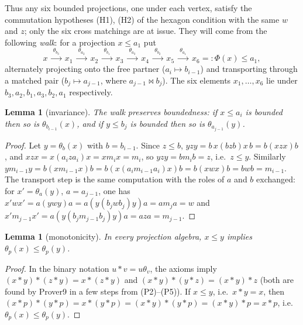 \documentclass[11pt]{amsart}
\newtheorem{lemma}[theorem]{Lemma}
\theoremstyle{definition}
\newcommand{\mt}{\bowtie}   %
\begin{document}
Thus any six bounded projections, one under each vertex, satisfy the commutation hypotheses (H1), (H2) of the hexagon condition with the same $w$ and $z$; only the six cross matchings are at issue. They will come from the following \emph{walk}: for a projection $x\le a_1$ put
\[
x\ \xrightarrow{\ \theta_{b_3}\ }\ x_1\ \xrightarrow{\ \theta_{a_2}\ }\ x_2\ \xrightarrow{\ \theta_{b_1}\ }\ x_3\ \xrightarrow{\ \theta_{a_3}\ }\ x_4\ \xrightarrow{\ \theta_{b_2}\ }\ x_5\ \xrightarrow{\ \theta_{a_1}\ }\ x_6=:\Phi(x)\le a_1 ,
\]
alternately projecting onto the free partner ($a_i\mapsto b_{i-1}$) and transporting through a matched pair ($b_j\mapsto a_{j-1}$, where $a_{j-1}\mt b_j$). The six elements $x_1,\dots,x_6$ lie under $b_3,a_2,b_1,a_3,b_2,a_1$ respectively.

\begin{lemma}[invariance]\label{lem:inv}
The walk preserves boundedness: if $x\le a_i$ is bounded then so is $\theta_{b_{i-1}}(x)$, and if $y\le b_j$ is bounded then so is $\theta_{a_{j-1}}(y)$.
\end{lemma}
\begin{proof}
Let $y=\theta_b(x)$ with $b=b_{i-1}$. Since $z\le b$, $yzy=b\,x(bzb)x\,b=b(xzx)b$, and $xzx=x(a_iza_i)x=xm_ix=m_i$, so $yzy=bm_ib=z$, i.e.\ $z\le y$. Similarly $ym_{i-1}y=b(xm_{i-1}x)b=b(x(a_im_{i-1}a_i)x)b=b(xwx)b=bwb=m_{i-1}$. The transport step is the same computation with the roles of $a$ and $b$ exchanged: for $x'=\theta_a(y)$, $a=a_{j-1}$, one has $x'wx'=a(ywy)a=a(y(b_jwb_j)y)a=am_ja=w$ and $x'm_{j-1}x'=a(y(b_jm_{j-1}b_j)y)a=aza=m_{j-1}$.
\end{proof}

\begin{lemma}[monotonicity]\label{lem:mono}
In every projection algebra, $x\le y$ implies $\theta_p(x)\le\theta_p(y)$.
\end{lemma}
\begin{proof}
In the binary notation $u*v=u\theta_v$, the axioms imply $(x*y)*(z*y)=x*(z*y)$ and $(x*y)*(y*z)=(x*y)*z$ (both are found by Prover9 in a few steps from (P2)--(P5)). If $x\le y$, i.e.\ $x*y=x$, then $(x*p)*(y*p)=x*(y*p)=(x*y)*(y*p)=(x*y)*p=x*p$, i.e.\ $\theta_p(x)\le\theta_p(y)$.
\end{proof}
\end{document}
